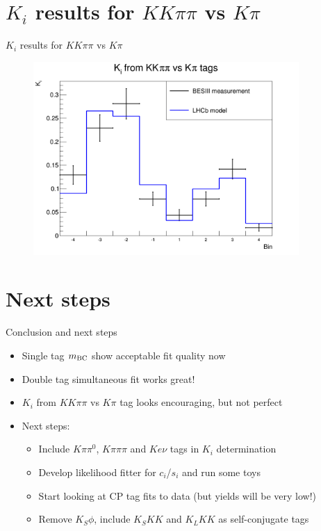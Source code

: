 \documentclass{beamer}
\begin{document}
\section{\texorpdfstring{$K_i$}{Ki} results for \texorpdfstring{$KK\pi\pi$}{KKpipi} vs \texorpdfstring{$K\pi$}{Kpi}}
\begin{frame}{$K_i$ results for $KK\pi\pi$ vs $K\pi$}
  \begin{figure}
    \centering
    \includegraphics[width=0.9\textwidth]{Plots/Kpi_Ki.png}
  \end{figure}
\end{frame}

\section{Next steps}
\begin{frame}{Conclusion and next steps}
  \begin{itemize}
    \setlength\itemsep{1.5em}
    \item{Single tag $m_{\rm BC}$ show acceptable fit quality now}
    \item{Double tag simultaneous fit works great!}
    \item{$K_i$ from $KK\pi\pi$ vs $K\pi$ tag looks encouraging, but not perfect}
    \item{Next steps:}
    \begin{itemize}
      \item{Include $K\pi\pi^0$, $K\pi\pi\pi$ and $Ke\nu$ tags in $K_i$ determination}
      \item{Develop likelihood fitter for $c_i$/$s_i$ and run some toys}
      \item{Start looking at CP tag fits to data (but yields will be very low!)}
      \item{Remove $K_S\phi$, include $K_SKK$ and $K_LKK$ as self-conjugate tags}
    \end{itemize}
  \end{itemize}
\end{frame}
\end{document}
